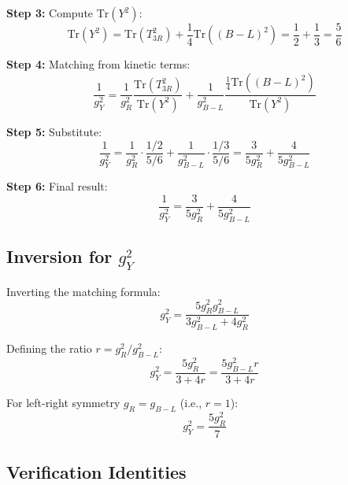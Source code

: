 \documentclass[11pt,a4paper]{article}
\begin{document}
\textbf{Step 3:} Compute $\mathrm{Tr}(Y^2)$:
\begin{equation}
\label{eq:step3}
\mathrm{Tr}(Y^2) = \mathrm{Tr}(T_{3R}^2) + \frac{1}{4}\mathrm{Tr}((B-L)^2) = \frac{1}{2} + \frac{1}{3} = \frac{5}{6}
\end{equation}

\textbf{Step 4:} Matching from kinetic terms:
\begin{equation}
\label{eq:step4}
\frac{1}{g_Y^2} = \frac{1}{g_R^2} \frac{\mathrm{Tr}(T_{3R}^2)}{\mathrm{Tr}(Y^2)} + \frac{1}{g_{B-L}^2} \frac{\frac{1}{4}\mathrm{Tr}((B-L)^2)}{\mathrm{Tr}(Y^2)}
\end{equation}

\textbf{Step 5:} Substitute:
\begin{equation}
\label{eq:step5}
\frac{1}{g_Y^2} = \frac{1}{g_R^2} \cdot \frac{1/2}{5/6} + \frac{1}{g_{B-L}^2} \cdot \frac{1/3}{5/6}
= \frac{3}{5g_R^2} + \frac{4}{5g_{B-L}^2}
\end{equation}

\textbf{Step 6:} Final result:
\begin{equation}
\label{eq:step6}
\boxed{\frac{1}{g_Y^2} = \frac{3}{5g_R^2} + \frac{4}{5g_{B-L}^2}}
\end{equation}

\subsection{Inversion for $g_Y^2$}
\label{app:inversion}

Inverting the matching formula:
\begin{equation}
\label{eq:gy-inverted}
g_Y^2 = \frac{5 g_R^2 g_{B-L}^2}{3 g_{B-L}^2 + 4 g_R^2}
\end{equation}

Defining the ratio $r = g_R^2 / g_{B-L}^2$:
\begin{equation}
\label{eq:ratio-def}
g_Y^2 = \frac{5 g_R^2}{3 + 4r} = \frac{5 g_{B-L}^2 r}{3 + 4r}
\end{equation}

For left-right symmetry $g_R = g_{B-L}$ (i.e., $r = 1$):
\begin{equation}
\label{eq:lr-sym-gy}
g_Y^2 = \frac{5 g_R^2}{7}
\end{equation}

\subsection{Verification Identities}
\label{app:verification-identities}
\end{document}
